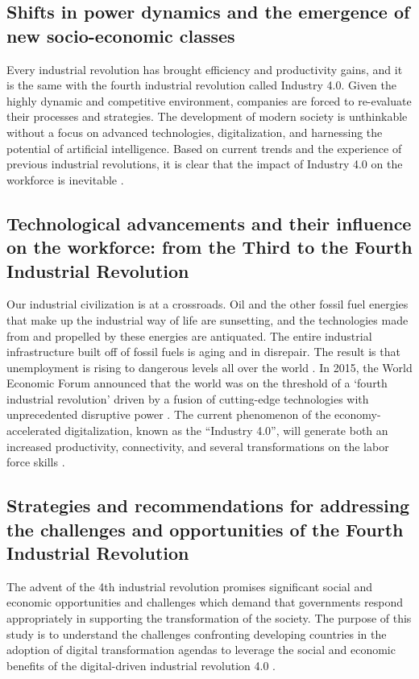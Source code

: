 \documentclass{article}
\begin{document}
\subsection{Shifts in power dynamics and the emergence of new socio-economic classes}

Every industrial revolution has brought efficiency and productivity gains, and it is the same with the fourth industrial revolution called Industry 4.0. Given the highly dynamic and competitive environment, companies are forced to re-evaluate their processes and strategies. The development of modern society is unthinkable without a focus on advanced technologies, digitalization, and harnessing the potential of artificial intelligence. Based on current trends and the experience of previous industrial revolutions, it is clear that the impact of Industry 4.0 on the workforce is inevitable \cite{Kubiov2022ImplementationOE}.

\subsection{Technological advancements and their influence on the workforce: from the Third to the Fourth Industrial Revolution}

Our industrial civilization is at a crossroads. Oil and the other fossil fuel energies that make up the industrial way of life are sunsetting, and the technologies made from and propelled by these energies are antiquated. The entire industrial infrastructure built off of fossil fuels is aging and in disrepair. The result is that unemployment is rising to dangerous levels all over the world \cite{Rifkin2012TheTI}. In 2015, the World Economic Forum announced that the world was on the threshold of a ‘fourth industrial revolution’ driven by a fusion of cutting-edge technologies with unprecedented disruptive power \cite{Schilin2020RevolutionaryDF}. The current phenomenon of the economy-accelerated digitalization, known as the “Industry 4.0”, will generate both an increased productivity, connectivity, and several transformations on the labor force skills \cite{Androniceanu2020CanonicalCA}.

\subsection{Strategies and recommendations for addressing the challenges and opportunities of the Fourth Industrial Revolution}

The advent of the 4th industrial revolution promises significant social and economic opportunities and challenges which demand that governments respond appropriately in supporting the transformation of the society. The purpose of this study is to understand the challenges confronting developing countries in the adoption of digital transformation agendas to leverage the social and economic benefits of the digital-driven industrial revolution 4.0 \cite{Manda2019RespondingTT}.
\end{document}
